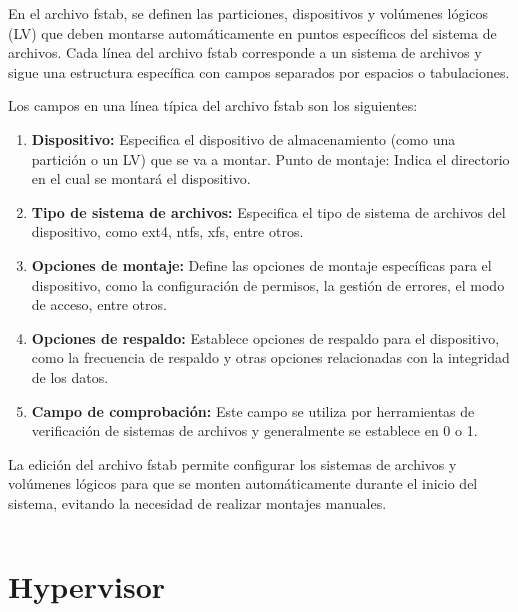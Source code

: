 			En el archivo fstab, se definen las particiones, dispositivos y volúmenes lógicos (LV) que deben montarse automáticamente en puntos específicos del sistema de archivos. Cada línea del archivo fstab corresponde a un sistema de archivos y sigue una estructura específica con campos separados por espacios o tabulaciones.\par
			
			Los campos en una línea típica del archivo fstab son los siguientes:
			
			\begin{enumerate}
				
				\item \textbf{Dispositivo:} Especifica el dispositivo de almacenamiento (como una partición o un LV) que se va a montar.
				Punto de montaje: Indica el directorio en el cual se montará el dispositivo.
			
				\item \textbf{Tipo de sistema de archivos:} Especifica el tipo de sistema de archivos del dispositivo, como ext4, ntfs, xfs, entre otros.
			
				\item \textbf{Opciones de montaje:} Define las opciones de montaje específicas para el dispositivo, como la configuración de permisos, la gestión de errores, el modo de acceso, entre otros.
			
				\item \textbf{Opciones de respaldo:} Establece opciones de respaldo para el dispositivo, como la frecuencia de respaldo y otras opciones relacionadas con la integridad de los datos.
			
				\item \textbf{Campo de comprobación:} Este campo se utiliza por herramientas de verificación de sistemas de archivos y generalmente se establece en 0 o 1.
			
			\end{enumerate}
		
			La edición del archivo fstab permite configurar los sistemas de archivos y volúmenes lógicos para que se monten automáticamente durante el inicio del sistema, evitando la necesidad de realizar montajes manuales.

				\vspace{0.3cm}
									
				\inputminted{bash}{documentos/fstab/fstab}
				
			
			\section{Hypervisor}
			
